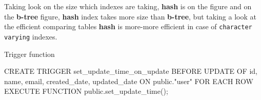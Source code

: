 Taking look on the size which indexes are taking, \textbf{hash} is on the figure and on the \textbf{b-tree} figure,
\textbf{hash} index takes more size than \textbf{b-tree}, but taking a look at the efficient comparing tables
\textbf{hash} is more-more efficient in case of \texttt{character varying} indexes.


Trigger function



CREATE TRIGGER set_update_time_on_update
BEFORE UPDATE OF id, name, email, created_date, updated_date
ON public."user"
FOR EACH ROW
EXECUTE FUNCTION public.set_update_time();